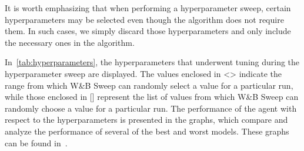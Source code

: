 \documentclass[../xlapes02]{subfiles}
\begin{document}
    It is worth emphasizing that when performing a hyperparameter sweep, certain hyperparameters may be selected even though the algorithm does not require them. In such cases, we simply discard those hyperparameters and only include the necessary ones in the algorithm.

    In~\cref{tab:hyperparameters}, the hyperparameters that underwent tuning during the hyperparameter sweep are displayed. The values enclosed in <> indicate the range from which W\&B Sweep can randomly select a value for a particular run, while those enclosed in [] represent the list of values from which W\&B Sweep can randomly choose a value for a particular run. The performance of the agent with respect to the hyperparameters is presented in the graphs, which compare and analyze the performance of several of the best and worst models. These graphs can be found in~.
\end{document}

